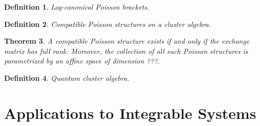 \documentclass{amsart}
\newtheorem{theorem}{Theorem}[section]
\newtheorem{definition}[theorem]{Definition}
\theoremstyle{remark}
\numberwithin{equation}{section}
\begin{document}
  \begin{definition}
    Log-canonical Poisson brackets.
  \end{definition}

  \begin{definition}
    Compatible Poisson structures on a cluster algebra.
  \end{definition}

  \begin{theorem}
    A compatible Poisson structure exists if and only if the exchange matrix has full rank.  Moreover, the collection of all such Poisson structures is parametrized by an affine space of dimension ???.
  \end{theorem}

  \begin{definition}
    Quantum cluster algebra.
  \end{definition}

\section{Applications to Integrable Systems}


\begin{thebibliography}{99}

\end{thebibliography}
\end{document}

